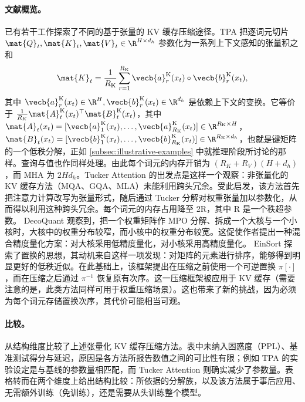 \paragraph{文献概览。} 已有若干工作探索了不同的基于张量的 KV 缓存压缩途径。TPA \cite{zhang2026tpa} 把逐词元切片 $\mat{Q}_t, \mat{K}_t, \mat{V}_t \in \R^{H \times d_h}$ 参数化为一系列上下文感知的张量积之和
\begin{equation}
\mat{K}_t = \frac{1}{R_{\rm K}} \sum_{r=1}^{R_{\rm K}} \vecb{a}_r^{\rm K}(x_t) \circ \vecb{b}_r^{\rm K}(x_t),
\end{equation}
其中 $\vecb{a}_r^{\rm K}(x_t) \in \R^H, \vecb{b}_r^{\rm K}(x_t) \in \R^{d_h}$ 是依赖上下文的变换。它等价于 $\frac{1}{R_K} \mat{A}^{\rm K}_t(x_t)^\top \mat{B}^{\rm K}_t(x_t)$，其中 $\mat{A}_t(x_t) = [\vecb{a}^{\rm K}_1(x_t), \ldots, \vecb{a}^{\rm K}_{R_{\rm K}}(x_t)] \in \R^{R_{\rm K} \times H}$，$\mat{B}_t(x_t) = [\vecb{b}_1^{\rm K}(x_t), \ldots, \vecb{b}_{R_{\rm K}}^{\rm K}(x_t)] \in \R^{R_{\rm K} \times d_h}$，也就是键矩阵的一个低秩分解，正如 \cref{subsec:illustrative-examples} 中就推理阶段所讨论的那样。查询与值也作同样处理。由此每个词元的内存开销为 $(R_K + R_V)(H + d_h)$，而 MHA 为 $2 H d_h$。Tucker Attention \cite{klein2026tuckerattention} 的出发点是这样一个观察：非张量化的 KV 缓存方法（MQA、GQA、MLA）未能利用跨头冗余。受此启发，该方法首先把注意力计算改写为张量形式，随后通过 Tucker 分解对权重张量加以参数化，从而得以利用这种跨头冗余。每个词元的内存占用降至 2R，其中 R 是一个秩超参数。
DecoQuant \cite{liu2024decoquant} 观察到，把一个权重矩阵作 MPO 分解、拆成一个大核与一个小核时，大核中的权重分布较窄，而小核中的权重分布较宽。这促使作者提出一种混合精度量化方案：对大核采用低精度量化，对小核采用高精度量化。
EinSort \cite{koikeakino2026einsort} 探索了置换的思想，其动机来自这样一项发现：对矩阵的元素进行排序，能够得到明显更好的低秩近似。在此基础上，该框架提出在压缩之前使用一个可逆置换 $\pi[\cdot]$，而在压缩之后通过 $\pi^{-1}$ 恢复原有次序。这一压缩框架被应用于 KV 缓存（需要注意的是，此类方法同样可用于权重压缩场景）。这也带来了新的挑战，因为必须为每个词元存储置换次序，其代价可能相当可观。

\paragraph{比较。} 

 从结构维度比较了上述张量化 KV 缓存压缩方法。表中未纳入困惑度（PPL）、基准测试得分与延迟，原因是各方法所报告数值之间的可比性有限；例如 TPA 的实验设定是与基线的参数量相匹配，而 Tucker Attention 则确实减少了参数量。表格转而在两个维度上给出结构比较：所依据的分解族，以及该方法属于事后应用、无需额外训练（免训练），还是需要从头训练整个模型。

